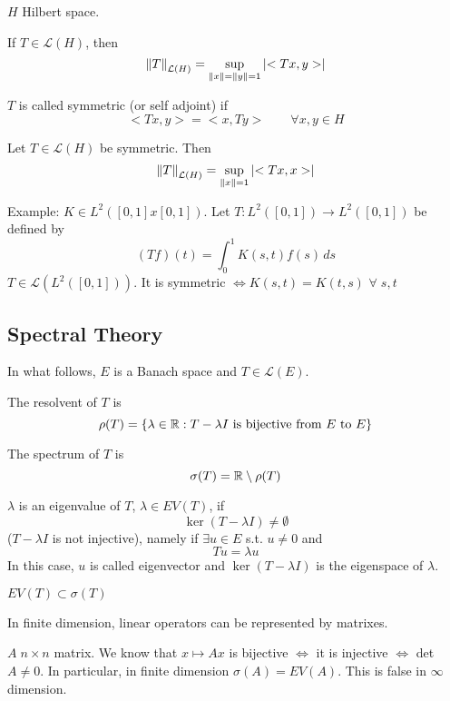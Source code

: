 \(H\) Hilbert space. 
\begin{proposition}
    If \(T \in \mathcal{L}(H)\), then
    \[
        \norm{T}_{\mathcal{L}(H)} = \sup_{\norm{x}=\norm{y}=1} \abs{<Tx, y>}
    \]
\end{proposition}
\begin{definition}
    \(T \) is called symmetric (or self adjoint) if 
    \[
        <Tx, y> = <x, Ty> \qquad \forall x, y \in H
    \]
\end{definition}
\begin{proposition}
    Let \(T \in \mathcal{L}(H)\) be symmetric. Then 
    \[
        \norm{T}_{\mathcal{L}(H)} = \sup_{\norm{x}= 1} \abs{<Tx, x>}
    \]
\end{proposition}

Example: \(K \in L^2([0, 1]x[0, 1])\). Let \(T: L^2([0, 1]) \to L^2([0, 1])\) be defined by 
\[
    (Tf)(t) = \int_0^1 K(s, t) f(s) \,ds
\]
\(T \in \mathcal{L}(L^2([0, 1]))\). It is symmetric \(\iff K(s, t) = K(t, s)\) \(\forall \; s, t\)

\subsection*{Spectral Theory}
In what follows, \(E\) is a Banach space and \(T \in \mathcal{L}(E)\).

\begin{definition}
    The resolvent of \(T\) is 
    \[
        \rho(T) = \{ \lambda \in \mathbb{R}: T - \lambda I \text{ is bijective from } E \text{ to } E\}
    \]
\end{definition}
\begin{definition}
    The spectrum of \(T\) is    
    \[
        \sigma(T) = \mathbb{R} \setminus \rho(T)
    \]
\end{definition}
\begin{definition}
    \(\lambda\) is an eigenvalue of \(T\), \(\lambda \in EV(T) \), if 
    \[
        \ker(T- \lambda I) \neq \emptyset
    \]
    (\(T - \lambda I\) is not injective), namely if \(\exists u \in E\) s.t. \(u \neq 0\) and
    \[
        T u = \lambda u
    \]
    In this case, \(u\) is called eigenvector and \(\ker(T-\lambda I)\) is the eigenspace of \(\lambda\).
\end{definition}
\begin{remark}
    \(EV(T) \subset \sigma(T)\)
\end{remark}
\begin{remark}
    In finite dimension, linear operators can be represented by matrixes.

    \(A \; n \times n\) matrix. We know that \(x \mapsto Ax\) is bijective \(\iff \) it is injective \(\iff \) det\(A \neq 0\). In particular, in finite dimension \(\sigma(A) = EV(A)\). This is false in \(\infty \) dimension.
\end{remark}

